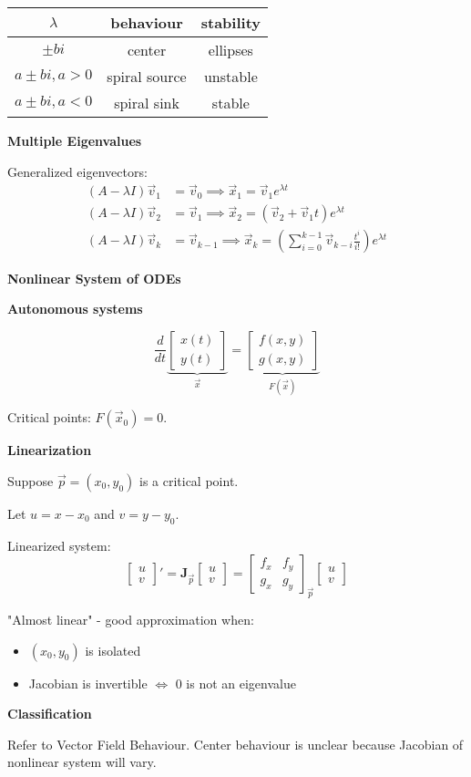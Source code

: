 \documentclass[10pt]{article}
\newcommand{\matr}[1]{\mathbf{#1}}
\newcommand{\vvec}[2]{\begin{bmatrix}#1 \\ #2 \end{bmatrix}}
\newcommand\sectionheading[1]{\begin{center}\large{\textbf{#1}}\end{center}\normalsize}
\newcommand\heading[1]{\smallskip\textbf{#1}\smallskip}
\begin{document}
\begin{multicols*}{3}
\begin{tabular}{|c|c|c|}
    \hline
    $\lambda$ & behaviour & stability \\
    \hline
    $\pm bi$ & center & ellipses \\
    $a\pm bi, a>0$ & spiral source & unstable \\
    $a\pm bi, a<0$ & spiral sink & stable \\
    \hline
\end{tabular}

\heading{Multiple Eigenvalues}

Generalized eigenvectors:
\begin{align*}
    (A-\lambda I)\vec v_1&=\vec v_0 \implies \vec x_1 = \vec v_1e^{\lambda t} \\
    (A-\lambda I)\vec v_2&=\vec v_1 \implies \vec x_2 = (\vec v_2+\vec v_1 t)e^{\lambda t} \\
    (A-\lambda I)\vec v_k&=\vec v_{k-1} \implies \vec x_k=\left(\sum_{i=0}^{k-1}\vec v_{k-i}\frac{t^i}{i!}\right)e^{\lambda t}
\end{align*}

\sectionheading{Nonlinear System of ODEs}

\heading{Autonomous systems}

\[\frac{d}{dt}\underbrace{\vvec{x(t)}{y(t)}}_{\vec x}=\underbrace{\vvec{f(x,y)}{g(x,y)}}_{F(\vec x)}\]

Critical points: $F(\vec x_0)=0$.

\heading{Linearization}

Suppose $\vec p=(x_0,y_0)$ is a critical point. 

Let $u=x-x_0$ and $v=y-y_0$. 

Linearized system:
\[\vvec{u}{v}'=\matr{J}_{\vec{p}}\vvec{u}{v}=\begin{bmatrix}
    f_x & f_y \\
    g_x & g_y
\end{bmatrix}_{\vec p}\vvec{u}{v}\]

"Almost linear" - good approximation when:
\begin{itemize}[noitemsep,topsep=0pt]
    \item $(x_0,y_0)$ is isolated
    \item Jacobian is invertible $\Leftrightarrow$ $0$ is not an eigenvalue
\end{itemize}

\heading{Classification}

Refer to Vector Field Behaviour. Center behaviour is unclear because Jacobian of nonlinear system will vary.


\end{multicols*}
\end{document}

